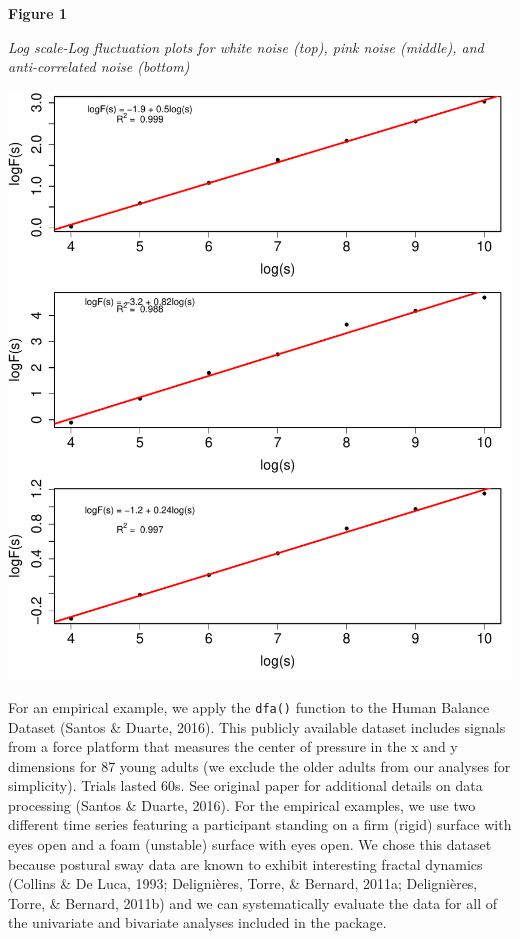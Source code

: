 \documentclass[
  man]{apa6}
\begin{document}
\textbf{Figure 1}

\emph{Log scale-Log fluctuation plots for white noise (top), pink noise
(middle), and anti-correlated noise (bottom)}

\includegraphics{fractal_regression_paper_brm_files/figure-latex/unnamed-chunk-3-1.pdf}

For an empirical example, we apply the \texttt{dfa()} function to the Human
Balance Dataset (Santos \& Duarte, 2016). This publicly available dataset includes
signals from a force platform that measures the center of pressure in
the x and y dimensions for 87 young adults (we exclude the older adults
from our analyses for simplicity). Trials lasted 60s. See original paper
for additional details on data processing (Santos \& Duarte, 2016). For the
empirical examples, we use two different time series featuring a
participant standing on a firm (rigid) surface with eyes open and a foam
(unstable) surface with eyes open. We chose this dataset because
postural sway data are known to exhibit interesting fractal dynamics
(Collins \& De Luca, 1993; Delignières, Torre, \& Bernard, 2011a; Delignières, Torre, \& Bernard, 2011b) and we can
systematically evaluate the data for all of the univariate and bivariate
analyses included in the package.
\end{document}
